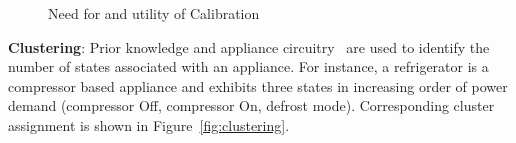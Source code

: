\documentclass[conference]{IEEEtran}
\newcommand{\figref}[1]{Figure~\ref{#1}}
\begin{document}
\begin{figure} 
     \hspace{2pt}
    \vspace{-8pt}
    \caption{Need for and utility of Calibration}
    \vspace{-20pt}
    \label{fig:calibration}
\end{figure}

\noindent\textbf{Clustering}: Prior knowledge and appliance circuitry~\cite{ting2005} are used to identify the number of states associated with an appliance. For instance, a refrigerator is a compressor based appliance and exhibits three states in increasing order of power demand (compressor Off, compressor On, defrost mode). Corresponding cluster assignment is shown in \figref{fig:clustering}. %
\end{document}
